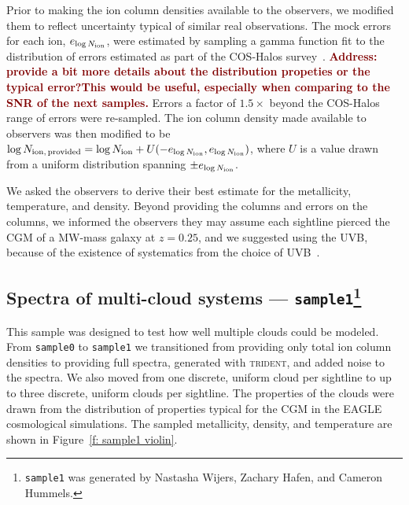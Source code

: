 \documentclass[fleqn,usenatbib]{mnras}
\newcommand{\todo}[1]{\textcolor{Maroon}{\textbf{Address: #1}}}
\begin{document}
Prior to making the ion column densities available to the observers, we modified them to reflect uncertainty typical of similar real observations.
The mock errors for each ion, $e_{\log N_{\rm ion}}$, were estimated by sampling a gamma function fit to the distribution of errors estimated as part of the COS-Halos survey~\citep{werk2013COSHALOS}.
\todo{provide a bit more details about the distribution propeties or the typical error?This would be useful, especially when comparing to the SNR of the next samples.}
Errors a factor of $1.5\times$ beyond the COS-Halos range of errors were re-sampled.
The ion column density made available to observers was then modified to be $\log N_{\rm ion,\,provided} = \log N_{\rm ion} + U(-e_{\log N_{\rm ion}}, e_{\log N_{\rm ion}} )$, where $U$ is a value drawn from a uniform distribution spanning $\pm e_{\log N_{\rm ion}}$.

We asked the observers to derive their best estimate for the metallicity, temperature, and density.
Beyond providing the columns and errors on the columns, we informed the observers they may assume each sightline pierced the CGM of a MW-mass galaxy at $z=0.25$, and we suggested using the \cite{haardt2012RADIATIVE} UVB, because of the existence of systematics from the choice of UVB~\citep{Wotta2016, Wotta2019, acharya2021How,Gibson2022}.

\subsection[Spectra of multi-cloud systems --- \texttt{sample1}]{Spectra of multi-cloud systems --- \texttt{sample1}\footnote{
\texttt{sample1} was generated by Nastasha Wijers, Zachary Hafen, and Cameron Hummels.
}}
\label{s: data generation -- sample1}

This sample was designed to test how well multiple clouds could be modeled.
From \texttt{sample0} to \texttt{sample1} we transitioned from providing only total ion column densities to providing full spectra, generated with \textsc{trident}, and added noise to the spectra.
We also moved from one discrete, uniform cloud per sightline to up to three discrete, uniform clouds per sightline.
The properties of the clouds were drawn from the distribution of properties typical for the CGM in the \textsc{EAGLE} cosmological simulations.
The sampled metallicity, density, and temperature are shown in Figure~\ref{f: sample1 violin}.
\end{document}
